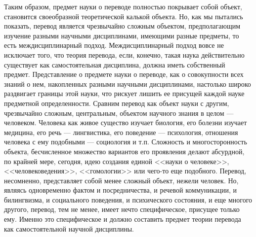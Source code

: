 Таким образом, предмет науки о переводе полностью покрывает собой объект, становится своеобразной теоретической калькой объекта. Но, как мы пытались показать, перевод является чрезвычайно сложным объектом, предполагающим изучение разными научными дисциплинами, имеющими разные предметы, то есть междисциплинарный подход. Междисциплинарный подход вовсе не исключает того, что теория перевода, если, конечно, такая наука действительно существует как самостоятельная дисциплина, должна иметь собственный предмет. Представление о предмете науки о переводе, как о совокупности всех знаний о нем, накопленных разными научными дисциплинами, настолько широко раздвигает границы этой науки, что рискует лишить ее присущей каждой науке предметной определенности. Сравним перевод как объект науки с другим, чрезвычайно сложным, центральным, объектом научного знания в целом --- человеком. Человека как живое существо изучает биология, его болезни изучает медицина, его речь --- лингвистика, его поведение --- психология, отношения человека с ему подобными --- социология и т.п. Сложность и многосторонность объекта, бесчисленное множество вариантов его проявления делают абсурдной, по крайней мере, сегодня, идею создания единой <<науки о человеке>>, <<человековедения>>, <<гомологии>> или чего-то еще подобного. Перевод, несомненно, представляет собой менее сложный объект, нежели человек. Но, являясь одновременно фактом и посредничества, и речевой коммуникации, и билингвизма, и социального поведения, и психического состояния, и еще многого другого, перевод, тем не менее, имеет нечто специфическое, присущее только ему. Именно это специфическое и должно составить предмет теории перевода как самостоятельной научной дисциплины.

